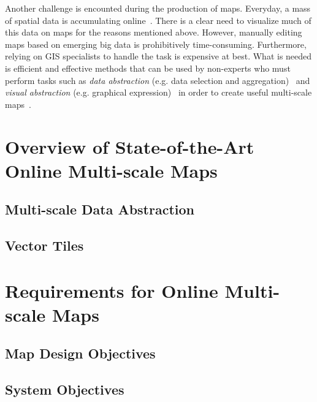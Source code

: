 \documentclass[11pt, oneside]{report}   	%
\begin{document}
Another challenge is encounted during the production of maps. Everyday, a mass of spatial data is accumulating online~\cite{agrawal2012bigdata}. There is a clear need to visualize much of this data on maps for the reasons mentioned above. However, manually editing maps based on emerging big data is prohibitively time-consuming. Furthermore, relying on GIS specialists to handle the task is expensive at best. What is needed is efficient and effective methods that can be used by non-experts who must perform tasks such as \emph{data abstraction} (e.g. data selection and aggregation)~\cite{haunert2006landcover,schmid2013opensciencemap} and \emph{visual abstraction} (e.g. graphical expression)~\cite{jacques1967semiologie} in order to create useful multi-scale maps~\cite{stolte2003multiscale,weibel1999generalising}. 


\section{Overview of State-of-the-Art Online Multi-scale Maps}
\subsection{Multi-scale Data Abstraction}
\subsection{Vector Tiles}

\section{Requirements for Online Multi-scale Maps}
\subsection{Map Design Objectives}
\subsection{System Objectives}
\end{document}
